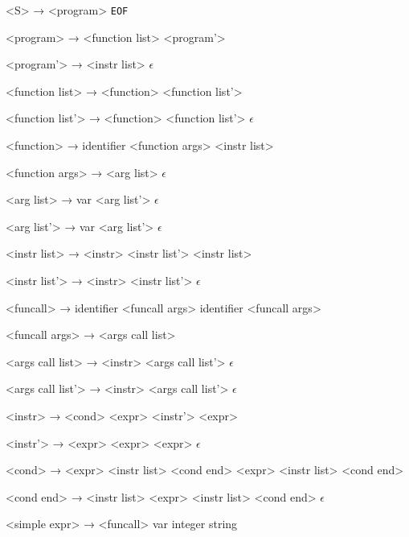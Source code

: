 ﻿<S>              → <program> \texttt{EOF}

<program>        → <function list> <program'>

<program'>       → <instr list>
                 \alt $\epsilon$

<function list>  → <function> <function list'>
                 
<function list'> → <function> <function list'>
		 \alt $\epsilon$

<function>       →  identifier <function args> \lit{\{} <instr list> \lit{\}}

<function args>  → \lit{(} <arg list> \lit{)}
                 \alt $\epsilon$

<arg list>       → var <arg list'>
                 \alt $\epsilon$

<arg list'>      → \lit{,} var <arg list'>
                 \alt $\epsilon$

<instr list>     → <instr> \lit{;} <instr list'>
                 \alt \lit{\{} <instr list> \lit{\}}

<instr list'>    → <instr> \lit{;} <instr list'>
                 \alt $\epsilon$

<funcall>        → \lit{\&} identifier <funcall args>
                 \alt identifier <funcall args>

<funcall args>   → \lit{(} <args call list> \lit{)}

<args call list> → <instr> <args call list'>
                 \alt $\epsilon$

<args call list'> → \lit{,} <instr> <args call list'>
                  \alt $\epsilon$

<instr>          → <cond>
                 \alt <expr> <instr'> 
                 \alt {} <expr>

<instr'>         → \lit{=} <expr>
                 \alt {} <expr>
                 \alt {} <expr>
                 \alt $\epsilon$

<cond>           →  <expr> \lit{\{} <instr list> \lit{\}} <cond end>
                 \alt {} <expr> \lit{\{} <instr list> \lit{\}} <cond end>

<cond end>       →  \lit{\{} <instr list> \lit{\}}
                 \alt {} <expr> \lit{\{} <instr list> \lit{\}} <cond end>
                 \alt $\epsilon$

<simple expr>    → <funcall>
                 \alt var
                 \alt integer
                 \alt string

